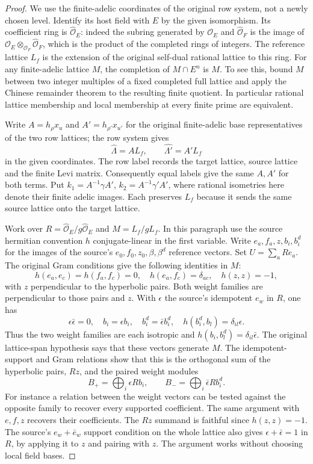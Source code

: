 \begin{proof}
We use the finite-adelic coordinates of the original
row system, not a newly chosen level. Identify its host
field with \(E\) by the given isomorphism. Its coefficient
ring is \(\widehat{\mathcal O}_E\): indeed the subring
generated by \(\mathcal O_E\) and
\(\widehat{\mathcal O}_F\) is the image of
\(\mathcal O_E\otimes_{\mathcal O_F}\widehat{\mathcal O}_F\),
which is the product of the completed rings of integers.
The reference lattice \(L_f\) is the extension of the
original self-dual rational lattice to this ring.
For any finite-adelic lattice \(M\), the completion of
\(M\cap E^n\) is \(M\). To see this, bound \(M\) between
two integer multiples of a fixed completed full lattice
and apply the Chinese remainder theorem to the resulting
finite quotient. In particular rational lattice membership
and local membership at every finite prime are equivalent.

Write \(A=h_\rho x_u\) and \(A'=h_{\rho'}x_{u'}\) for
the original finite-adelic base representatives of the
two row lattices; the row system gives
\[
 \widehat{\Lambda}=A L_f,\qquad
 \widehat{\Lambda'}=A'L_f
\]
in the given coordinates. The row label records the
target lattice, source lattice and the finite Levi matrix.
Consequently equal labels give the same \(A,A'\) for
both terms. Put
\(k_1=A^{-1}\gamma A'\), \(k_2=A^{-1}\gamma' A'\),
where rational isometries here denote their finite
adelic images. Each preserves \(L_f\) because it sends
the same source lattice onto the target lattice.

Work over \(R=\widehat{\mathcal O}_E/g\widehat{\mathcal O}_E\)
and \(M=L_f/gL_f\). In this paragraph use the source
hermitian convention \(h\) conjugate-linear in the
first variable. Write \(e_a,f_a,z,b_i,b_i^d\) for the
images of the source's \(e_0,f_0,z_0,\beta,\beta^d\)
reference vectors. Set \(U=\sum_a Re_a\). The original
Gram conditions give the following identities in \(M\):
\[
 h(e_a,e_c)=h(f_a,f_c)=0,\quad
 h(e_a,f_c)=\delta_{ac},\quad h(z,z)=-1,
\]
with \(z\) perpendicular to the hyperbolic pairs.
Both weight families are perpendicular to those pairs
and \(z\). With \(\epsilon\) the source's idempotent
\(e_w\) in \(R\), one has
\[
 \epsilon\bar\epsilon=0,\quad b_i=\epsilon b_i,\quad
 b_i^d=\bar\epsilon b_i^d,\quad
 h(b_i^d,b_l)=\delta_{il}\epsilon .
\]
Thus the two weight families are each isotropic and
\(h(b_i,b_l^d)=\delta_{il}\bar\epsilon\).
The original lattice-span hypothesis says that these
vectors generate \(M\). The idempotent-support and
Gram relations show that this is the orthogonal sum
of the hyperbolic pairs, \(Rz\), and the paired weight
modules
\[
 B_+=\bigoplus_i \epsilon R b_i,\qquad
 B_-=\bigoplus_i \bar\epsilon R b_i^d .
\]
For instance a relation between the weight vectors can
be tested against the opposite family to recover every
supported coefficient. The same argument with \(e,f,z\)
recovers their coefficients. The \(Rz\) summand is
faithful since \(h(z,z)=-1\).
The source's \(e_w+\bar e_w\) support condition on the
whole lattice also gives \(\epsilon+\bar\epsilon=1\)
in \(R\), by applying it to \(z\) and pairing with \(z\).
The argument works without choosing local field bases.


\end{proof}
